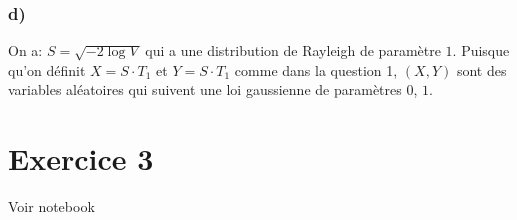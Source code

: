 \documentclass[math, info]{mpb-cours}
\begin{document}
\subsubsection{d)}
On a: $S = \sqrt{- 2\log V}$ qui a une distribution de Rayleigh de paramètre $1$.
Puisque qu'on définit $X = S\cdot T_{1}$ et $Y = S\cdot T_{1}$ comme dans la question 1, $(X, Y)$ sont des variables aléatoires qui suivent une loi gaussienne de paramètres $0$, $1$.

\section{Exercice 3}
Voir notebook
\end{document}

